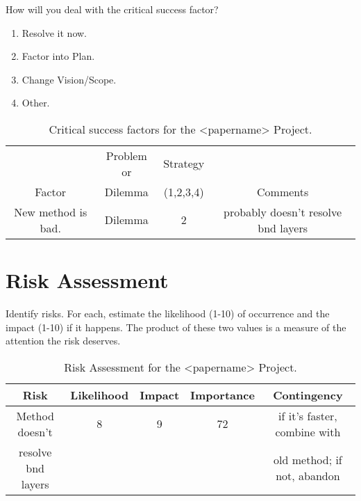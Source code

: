 \documentclass[11pt]{nmemo}
\begin{document}
How will you deal with the critical success factor?
\begin{enumerate}
  \item Resolve it now.
  \item Factor into Plan.
  \item Change Vision/Scope.
  \item Other.
\end{enumerate}

\begin{table}[ht]
  \begin{center}
    \caption{Critical success factors for the <papername> Project.}
    \label{tab:critical-success}
    \begin{tabular}{|c|c|c|c|} 
    \hline
                       & Problem or & Strategy  &          \\
    Factor             &  Dilemma   & (1,2,3,4) & Comments \\ 
    \hline\hline
    New method is bad. &  Dilemma   &    2      & probably doesn't
                                                  resolve bnd layers \\
    \hline
    \end{tabular}
  \end{center}
\end{table}


\newpage
\section*{Risk Assessment}

Identify risks.  For each, estimate the likelihood (1-10) of
occurrence and the impact (1-10) if it happens.  The product of these
two values is a measure of the attention the risk deserves.

\begin{table}[ht]
  \begin{center}
    \caption{Risk Assessment for the <papername> Project.}
    \label{tab:risk}
    \begin{tabular}{|c|c|c|c|c|} 
    \hline
    Risk               & Likelihood & Impact & Importance & Contingency\\ 
    \hline\hline
    Method doesn't     &    8       &   9    &    72      & if it's
                                                            faster,
                                                            combine
                                                            with \\ 
    resolve bnd layers &            &        &            & old
                                                            method; if
                                                            not,
                                                            abandon \\
    \hline
    \end{tabular}
  \end{center}
\end{table}
\end{document}
